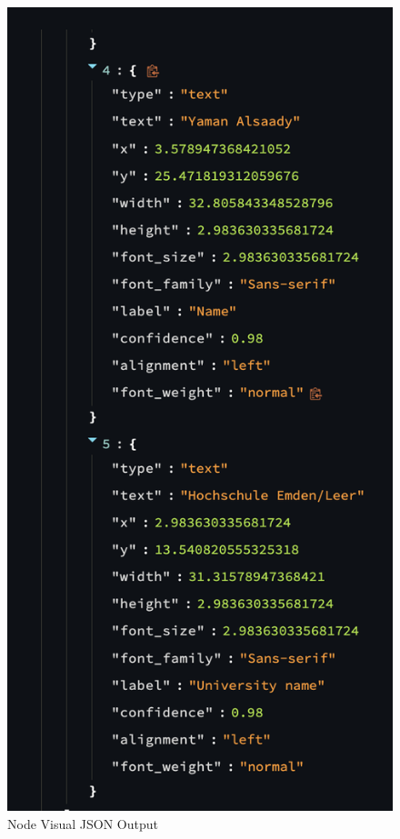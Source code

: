 \begin{figure}
	\begin{center}
		\includegraphics[width=0.4\linewidth]{Images/Visual.png}
		\caption{Node Visual JSON Output}
		\label{Visual} 
	\end{center}
\end{figure}

